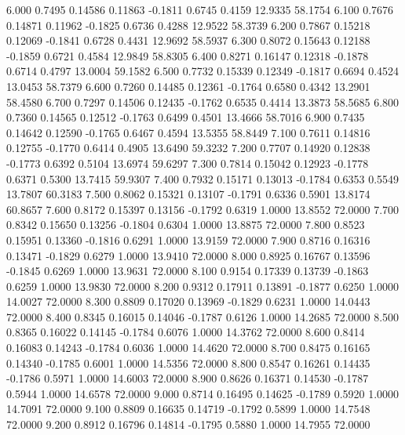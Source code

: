    6.000   0.7495   0.14586   0.11863  -0.1811   0.6745   0.4159  12.9335  58.1754
   6.100   0.7676   0.14871   0.11962  -0.1825   0.6736   0.4288  12.9522  58.3739
   6.200   0.7867   0.15218   0.12069  -0.1841   0.6728   0.4431  12.9692  58.5937
   6.300   0.8072   0.15643   0.12188  -0.1859   0.6721   0.4584  12.9849  58.8305
   6.400   0.8271   0.16147   0.12318  -0.1878   0.6714   0.4797  13.0004  59.1582
   6.500   0.7732   0.15339   0.12349  -0.1817   0.6694   0.4524  13.0453  58.7379
   6.600   0.7260   0.14485   0.12361  -0.1764   0.6580   0.4342  13.2901  58.4580
   6.700   0.7297   0.14506   0.12435  -0.1762   0.6535   0.4414  13.3873  58.5685
   6.800   0.7360   0.14565   0.12512  -0.1763   0.6499   0.4501  13.4666  58.7016
   6.900   0.7435   0.14642   0.12590  -0.1765   0.6467   0.4594  13.5355  58.8449
   7.100   0.7611   0.14816   0.12755  -0.1770   0.6414   0.4905  13.6490  59.3232
   7.200   0.7707   0.14920   0.12838  -0.1773   0.6392   0.5104  13.6974  59.6297
   7.300   0.7814   0.15042   0.12923  -0.1778   0.6371   0.5300  13.7415  59.9307
   7.400   0.7932   0.15171   0.13013  -0.1784   0.6353   0.5549  13.7807  60.3183
   7.500   0.8062   0.15321   0.13107  -0.1791   0.6336   0.5901  13.8174  60.8657
   7.600   0.8172   0.15397   0.13156  -0.1792   0.6319   1.0000  13.8552  72.0000
   7.700   0.8342   0.15650   0.13256  -0.1804   0.6304   1.0000  13.8875  72.0000
   7.800   0.8523   0.15951   0.13360  -0.1816   0.6291   1.0000  13.9159  72.0000
   7.900   0.8716   0.16316   0.13471  -0.1829   0.6279   1.0000  13.9410  72.0000
   8.000   0.8925   0.16767   0.13596  -0.1845   0.6269   1.0000  13.9631  72.0000
   8.100   0.9154   0.17339   0.13739  -0.1863   0.6259   1.0000  13.9830  72.0000
   8.200   0.9312   0.17911   0.13891  -0.1877   0.6250   1.0000  14.0027  72.0000
   8.300   0.8809   0.17020   0.13969  -0.1829   0.6231   1.0000  14.0443  72.0000
   8.400   0.8345   0.16015   0.14046  -0.1787   0.6126   1.0000  14.2685  72.0000
   8.500   0.8365   0.16022   0.14145  -0.1784   0.6076   1.0000  14.3762  72.0000
   8.600   0.8414   0.16083   0.14243  -0.1784   0.6036   1.0000  14.4620  72.0000
   8.700   0.8475   0.16165   0.14340  -0.1785   0.6001   1.0000  14.5356  72.0000
   8.800   0.8547   0.16261   0.14435  -0.1786   0.5971   1.0000  14.6003  72.0000
   8.900   0.8626   0.16371   0.14530  -0.1787   0.5944   1.0000  14.6578  72.0000
   9.000   0.8714   0.16495   0.14625  -0.1789   0.5920   1.0000  14.7091  72.0000
   9.100   0.8809   0.16635   0.14719  -0.1792   0.5899   1.0000  14.7548  72.0000
   9.200   0.8912   0.16796   0.14814  -0.1795   0.5880   1.0000  14.7955  72.0000
